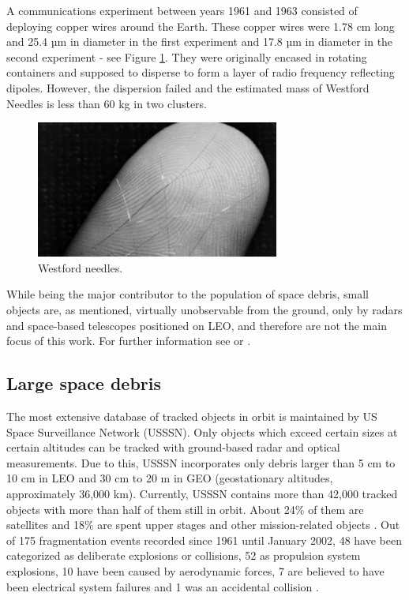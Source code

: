 	A communications experiment between years 1961 and 1963 consisted of deploying copper wires around the Earth. These copper wires were 1.78 cm long and 25.4 µm in diameter in the first experiment and 17.8 µm in diameter in the second experiment - see Figure \ref{fig:westfordneedles}. They were originally encased in rotating containers and supposed to disperse to form a layer of radio frequency reflecting dipoles. However, the dispersion failed and the estimated mass of Westford Needles is less than 60 kg in two clusters.
	
\begin{figure}[H]
\centering
  \includegraphics[width=8cm]{images/westfordneedles}
  \caption{Westford needles.}
  \label{fig:westfordneedles}
\end{figure}	
	
	While being the major contributor to the population of space debris, small objects are, as mentioned, virtually unobservable from the ground, only by radars and space-based telescopes positioned on LEO, and therefore are not the main focus of this work. For further information see \citep{klinkrad2006space} or \citep{Silha2012id}.

\subsection{Large space debris}\label{subsec:large_space_debris}

	The most extensive database of tracked objects in orbit is maintained by US Space Surveillance Network (USSSN). Only objects which exceed certain sizes at certain altitudes can be tracked with ground-based radar and optical measurements. Due to this, USSSN incorporates only debris larger than 5 cm to 10 cm in LEO and 30 cm to 20 m in GEO (geostationary altitudes, approximately 36,000 km). Currently, USSSN contains more than 42,000 tracked objects with more than half of them still in orbit. About 24\% of them are satellites and 18\% are spent upper stages and other mission-related objects \citep{esabr336}. Out of 175 fragmentation events recorded since 1961 until January 2002, 48 have been categorized as deliberate explosions or collisions, 52 as propulsion system explosions, 10 have been caused by aerodynamic forces, 7 are believed to have been electrical system failures and 1 was an accidental collision \citep{klinkrad2006space}. 

